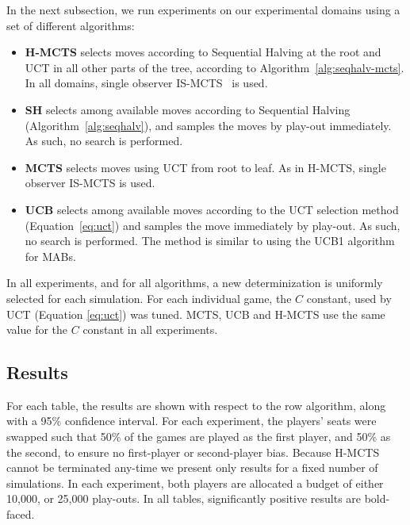 \documentclass[a4paper]{llncs}
\begin{document}
In the next subsection, we run experiments on our experimental domains using a set of different algorithms:
\begin{itemize}
\item \textbf{H-MCTS} selects moves according to Sequential Halving at the root and UCT in all other parts of the tree, according to Algorithm~\ref{alg:seqhalv-mcts}. In all domains, single observer IS-MCTS~\cite{cowling2012} is used.
\item \textbf{SH} selects among available moves according to Sequential Halving (Algorithm~\ref{alg:seqhalv}), and samples the moves by play-out immediately. As such, no search is performed.
\item \textbf{MCTS} selects moves using UCT from root to leaf. As in {\sc H-MCTS}, single observer IS-MCTS is used.
\item \textbf{UCB} selects among available moves according to the UCT selection method (Equation~\ref{eq:uct}) and samples the move immediately by play-out. As such, no search is performed. The method is similar to using the UCB1 algorithm for MABs.
\end{itemize}
In all experiments, and for all algorithms, a new determinization is uniformly selected for each simulation. For each individual game, the $C$ constant, used by UCT (Equation \ref{eq:uct}) was tuned. MCTS, UCB and H-MCTS use the same value for the $C$ constant in all experiments.

\subsection{Results}
\label{subsec:results}

For each table, the results are shown with respect to the row algorithm, along with a 95\% confidence interval. For each experiment, the players' seats were swapped such that 50\% of the games are played as the first player, and 50\% as the second, to ensure no first-player or second-player bias. Because H-MCTS cannot be terminated any-time we present only results for a fixed number of simulations. In each experiment, both players are allocated a budget of either 10,000, or 25,000 play-outs. In all tables, significantly positive results are bold-faced.
\end{document}
